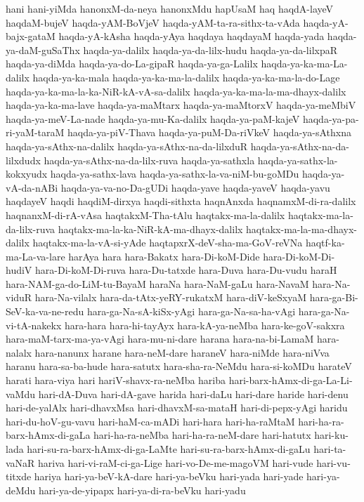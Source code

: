 {hani
hani-yiMda
hanonxM-da-neya
hanonxMdu
hapUsaM
haq
haqdA-layeV
haqdaM-bujeV
haqda-yAM-BoVjeV
haqda-yAM-ta-ra-sithx-ta-vAda
haqda-yA-bajx-gataM
haqda-yA-kAsha
haqda-yAya
haqdaya
haqdayaM
haqda-yada
haqda-ya-daM-guSaThx
haqda-ya-dalilx
haqda-ya-da-lilx-hudu
haqda-ya-da-lilxpaR
haqda-ya-diMda
haqda-ya-do-La-gipaR
haqda-ya-ga-Lalilx
haqda-ya-ka-ma-La-dalilx
haqda-ya-ka-mala
haqda-ya-ka-ma-la-dalilx
haqda-ya-ka-ma-la-do-Lage
haqda-ya-ka-ma-la-ka-NiR-kA-vA-sa-dalilx
haqda-ya-ka-ma-la-ma-dhayx-dalilx
haqda-ya-ka-ma-lave
haqda-ya-maMtarx
haqda-ya-maMtorxV
haqda-ya-meMbiV
haqda-ya-meV-La-nade
haqda-ya-mu-Ka-dalilx
haqda-ya-paM-kajeV
haqda-ya-pa-ri-yaM-taraM
haqda-ya-piV-Thava
haqda-ya-puM-Da-riVkeV
haqda-ya-sAthxna
haqda-ya-sAthx-na-dalilx
haqda-ya-sAthx-na-da-lilxduR
haqda-ya-sAthx-na-da-lilxdudx
haqda-ya-sAthx-na-da-lilx-ruva
haqda-ya-sathxla
haqda-ya-sathx-la-kokxyudx
haqda-ya-sathx-lava
haqda-ya-sathx-la-va-niM-bu-goMDu
haqda-ya-vA-da-nABi
haqda-ya-va-no-Da-gUDi
haqda-yave
haqda-yaveV
haqda-yavu
haqdayeV
haqdi
haqdiM-dirxya
haqdi-sithxta
haqnAnxda
haqnamxM-di-ra-dalilx
haqnanxM-di-rA-vAsa
haqtakxM-Tha-tAlu
haqtakx-ma-la-dalilx
haqtakx-ma-la-da-lilx-ruva
haqtakx-ma-la-ka-NiR-kA-ma-dhayx-dalilx
haqtakx-ma-la-ma-dhayx-dalilx
haqtakx-ma-la-vA-si-yAde
haqtapxrX-deV-sha-ma-GoV-reVNa
haqtf-ka-ma-La-va-lare
harAya
hara
hara-Bakatx
hara-Di-koM-Dide
hara-Di-koM-Di-hudiV
hara-Di-koM-Di-ruva
hara-Du-tatxde
hara-Duva
hara-Du-vudu
haraH
hara-NAM-ga-do-LiM-tu-BayaM
haraNa
hara-NaM-gaLu
hara-NavaM
hara-Na-viduR
hara-Na-vilalx
hara-da-tAtx-yeRY-rukatxM
hara-diV-keSxyaM
hara-ga-Bi-SeV-ka-va-ne-redu
hara-ga-Na-sA-kiSx-yAgi
hara-ga-Na-sa-ha-vAgi
hara-ga-Na-vi-tA-nakekx
hara-hara
hara-hi-tayAyx
hara-kA-ya-neMba
hara-ke-goV-sakxra
hara-maM-tarx-ma-ya-vAgi
hara-mu-ni-dare
harana
hara-na-bi-LamaM
hara-nalalx
hara-nanunx
harane
hara-neM-dare
haraneV
hara-niMde
hara-niVva
haranu
hara-sa-ba-hude
hara-satutx
hara-sha-ra-NeMdu
hara-si-koMDu
harateV
harati
hara-viya
hari
hariV-shavx-ra-neMba
hariba
hari-barx-hAmx-di-ga-La-Li-vaMdu
hari-dA-Duva
hari-dA-gave
harida
hari-daLu
hari-dare
haride
hari-denu
hari-de-yalAlx
hari-dhavxMsa
hari-dhavxM-sa-mataH
hari-di-pepx-yAgi
haridu
hari-du-hoV-gu-vavu
hari-haM-ca-mADi
hari-hara
hari-ha-raMtaM
hari-ha-ra-barx-hAmx-di-gaLa
hari-ha-ra-neMba
hari-ha-ra-neM-dare
hari-hatutx
hari-ku-lada
hari-su-ra-barx-hAmx-di-ga-LaMte
hari-su-ra-barx-hAmx-di-gaLu
hari-ta-vaNaR
hariva
hari-vi-raM-ci-ga-Lige
hari-vo-De-me-magoVM
hari-vude
hari-vu-titxde
hariya
hari-ya-beV-kA-dare
hari-ya-beVku
hari-yada
hari-yade
hari-ya-deMdu
hari-ya-de-yipapx
hari-ya-di-ra-beVku
hari-yadu
}
